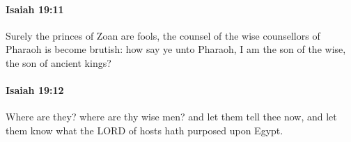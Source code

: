 		\paragraph{Isaiah 19:11} %
			\label{ISAIAH-19-11}

			Surely the princes of Zoan are fools, the counsel of the wise counsellors of Pharaoh is become brutish: how say ye unto Pharaoh, I am the son of the wise, the son of ancient kings?


		\paragraph{Isaiah 19:12} %
			\label{ISAIAH-19-12}

			Where are they? where are thy wise men? and let them tell thee now, and let them know what the LORD of hosts hath purposed upon Egypt.


